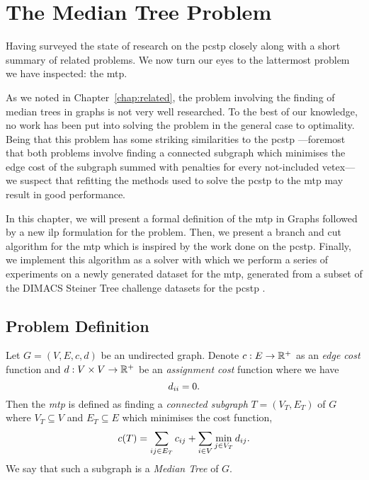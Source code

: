 \chapter{The Median Tree Problem}\label{chap:mediantree}
Having surveyed the state of research on the \gls{pcstp} closely along with a
short summary of related problems. We now turn our eyes to the lattermost problem we have inspected: the \gls{mtp}.

As we noted in Chapter~\ref{chap:related},
the problem involving the finding of median trees
in graphs is not very well researched. To the best of our knowledge, no work has been put into solving
the problem in the general case to optimality.
Being that this problem has some striking similarities
to the \gls{pcstp} ---foremost that both problems involve finding a connected
subgraph which minimises the edge cost of the subgraph summed with
penalties for every not-included vetex--- we suspect that refitting the
methods used to solve the \gls{pcstp} to the \gls{mtp} may result in good performance.

In this chapter, we will present a formal definition of the \acrlong{mtp} in Graphs
followed by a new \gls{ilp} formulation for the problem.
Then, we present a branch and cut algorithm for the \gls{mtp} which is inspired by the
work done on the \gls{pcstp}. Finally, we implement this algorithm as a solver with which
we perform a series of experiments on a newly generated dataset
for the \gls{mtp}, generated from a subset
of the DIMACS Steiner Tree challenge datasets for the \gls{pcstp} \citep{DIMACS}.
 
\section{Problem Definition}

Let $G = (V, E, c, d)$ be an undirected graph. Denote $c : E \to \mathbb{R}^+$ as an \textit{edge cost} function
and $d : V \times V  \to \mathbb{R}^+$ be an \textit{assignment cost} function where we have
$$d_{ii} = 0 \mathnormal{.}$$
Then the \textit{\acrlong{mtp}}
is defined as finding a \textit{connected subgraph} $T = (V_T, E_T)$ of $G$
where $V_T \subseteq V$ and
$E_T \subseteq E$ which minimises the cost function,
$$c(T) = \sum_{ij \in E_T} c_{ij} + \sum_{i \in V} \min_{j \in V_T} d_{ij}\mathnormal{.}$$
We say that such a subgraph is a \textit{Median Tree} of $G$.

